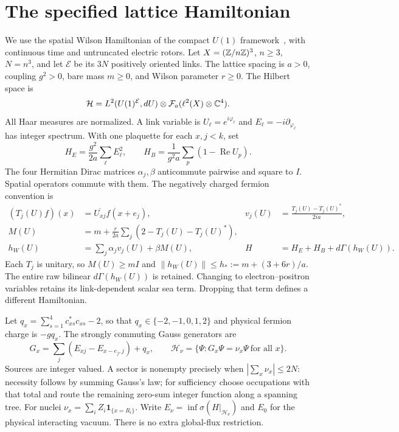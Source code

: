 \section{The specified lattice Hamiltonian}
\label{notes-model}

We use the spatial Wilson Hamiltonian of the compact $U(1)$
framework~\cite{KogutSusskind,Zache}, with continuous time and untruncated
electric rotors. Let $X=(\mathbb Z/n\mathbb Z)^3$, $n\ge3$, $N=n^3$, and let
$\mathcal E$ be its $3N$ positively oriented links.
The lattice spacing is $a>0$, coupling $g^2>0$, bare mass $m\ge0$,
and Wilson parameter $r\ge0$. The Hilbert space is
\[
 \mathcal H=L^2(U(1)^{\mathcal E},dU)\otimes
 \mathcal F_a(\ell^2(X)\otimes\mathbb C^4).
\]
All Haar measures are normalized. A link variable is
$U_\ell=e^{i\varphi_\ell}$ and $E_\ell=-i\partial_{\varphi_\ell}$
has integer spectrum. With one plaquette for each $x,j<k$, set
\[
 H_E=\frac{g^2}{2a}\sum_\ell E_\ell^2,\qquad
 H_B=\frac1{g^2a}\sum_p(1-\operatorname{Re}U_p).
\]
The four Hermitian Dirac matrices $\alpha_j,\beta$ anticommute
pairwise and square to $I$. Spatial operators commute with them.
The negatively charged fermion convention is
\begin{align}
 (T_j(U)f)(x)&=\overline{U_{xj}}f(x+e_j),&
 v_j(U)&=\frac{T_j(U)-T_j(U)^*}{2ia},\label{lat-hopping}\\
 M(U)&=m+\frac r{2a}\sum_j(2-T_j(U)-T_j(U)^*),&&\label{lat-wilson-mass}\\
 h_W(U)&=\sum_j\alpha_jv_j(U)+\beta M(U),&
 H&=H_E+H_B+d\Gamma(h_W(U)).\label{lat-hamiltonian}
\end{align}
Each $T_j$ is unitary, so
$M(U)\ge mI$ and $\|h_W(U)\|\le h_*:=m+(3+6r)/a$.
The entire raw bilinear $d\Gamma(h_W(U))$ is retained.
Changing to electron--positron variables retains its link-dependent
scalar sea term. Dropping that term defines a different Hamiltonian.

Let $q_x=\sum_{s=1}^4c_{xs}^*c_{xs}-2$, so that
$q_x\in\{-2,-1,0,1,2\}$ and physical fermion charge is $-gq_x$.
The strongly commuting Gauss generators are
\[
 G_x=\sum_j(E_{xj}-E_{x-e_j,j})+q_x,\qquad
 \mathcal H_\nu=\{\Psi:G_x\Psi=\nu_x\Psi\ \text{for all }x\}.
\]
Sources are integer valued. A sector is nonempty precisely when
$|\sum_x\nu_x|\le2N$: necessity follows by summing Gauss's law;
for sufficiency choose occupations with that total and route the
remaining zero-sum integer function along a spanning tree.
For nuclei $\nu_x=\sum_i Z_i\mathbf1_{\{x=R_i\}}$.
Write $E_\nu=\inf\sigma(H|_{\mathcal H_\nu})$ and $E_0$ for the
physical interacting vacuum. There is no extra global-flux restriction.

